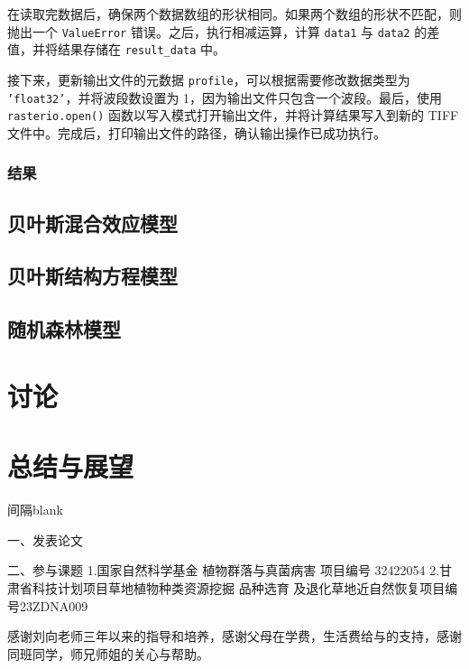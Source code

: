 \documentclass[AutoFakeBold]{LZUThesis-PgD&PhD}
\begin{document}
在读取完数据后，确保两个数据数组的形状相同。如果两个数组的形状不匹配，则抛出一个 \texttt{ValueError} 错误。之后，执行相减运算，计算 \texttt{data1} 与 \texttt{data2} 的差值，并将结果存储在 \texttt{result\_data} 中。

接下来，更新输出文件的元数据 \texttt{profile}，可以根据需要修改数据类型为 \texttt{'float32'}，并将波段数设置为 1，因为输出文件只包含一个波段。最后，使用 \texttt{rasterio.open()} 函数以写入模式打开输出文件，并将计算结果写入到新的 TIFF 文件中。完成后，打印输出文件的路径，确认输出操作已成功执行。

\subsection{结果}

\section{贝叶斯混合效应模型}

\section{贝叶斯结构方程模型}

\section{随机森林模型}




\chapter{讨论}

\chapter{总结与展望}

\blank

间隔blank
\blankpage




\backmatter


\printbib



\Achievements
一、发表论文


\blank

二、参与课题
1.国家自然科学基金 植物群落与真菌病害 项目编号 32422054
2.甘肃省科技计划项目草地植物种类资源挖掘 品种选育 及退化草地近自然恢复项目编号23ZDNA009



\Thanks

\Thanks

感谢刘向老师三年以来的指导和培养，感谢父母在学费，生活费给与的支持，感谢同班同学，师兄师姐的关心与帮助。
\end{document}
